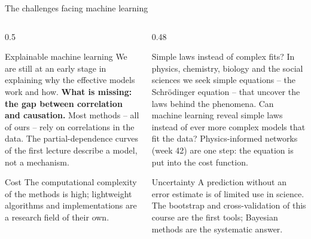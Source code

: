 \documentclass[10pt,aspectratio=169]{beamer}
\begin{document}
\begin{frame}{The challenges facing machine learning}
\begin{columns}[T]
\begin{column}{0.5\textwidth}
\small
\begin{block}{Explainable machine learning}
\footnotesize
We are still at an early stage in explaining why the effective models work
and how.  \textbf{What is missing: the gap between correlation and
causation.}  Most methods -- all of ours -- rely on correlations in the
data.  The partial-dependence curves of the first lecture describe a model,
not a mechanism.
\end{block}
\begin{block}{Cost}
\footnotesize
The computational complexity of the methods is high; lightweight
algorithms and implementations are a research field of their own.
\end{block}
\end{column}
\begin{column}{0.48\textwidth}
\small
\begin{block}{Simple laws instead of complex fits?}
\footnotesize
In physics, chemistry, biology and the social sciences we seek simple
equations -- the Schr\"odinger equation -- that uncover the laws behind the
phenomena.  Can machine learning reveal simple laws instead of ever more
complex models that fit the data?  Physics-informed networks (week 42) are
one step: the equation is put into the cost function.
\end{block}
\begin{block}{Uncertainty}
\footnotesize
A prediction without an error estimate is of limited use in science.  The
bootstrap and cross-validation of this course are the first tools; Bayesian
methods are the systematic answer.
\end{block}
\end{column}
\end{columns}
\end{frame}
\end{document}
